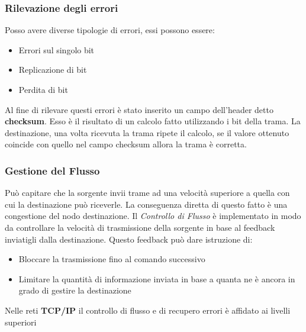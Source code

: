 \documentclass{article}
\begin{document}
        \subsubsection{Rilevazione degli errori}
            Posso avere diverse tipologie di errori, essi possono essere:
            \begin{itemize}
                \item Errori sul singolo bit
                \item Replicazione di bit
                \item Perdita di bit
            \end{itemize}
            Al fine di rilevare questi errori è stato inserito un campo dell'header detto \textbf{checksum}. Esso è il risultato di un calcolo fatto utilizzando i bit della trama. La destinazione, una volta ricevuta la trama ripete il calcolo, se il valore ottenuto coincide con quello nel campo checksum allora la trama è corretta. 

        \subsubsection{Gestione del Flusso}
            Può capitare che la sorgente invii trame ad una velocità superiore a quella con cui la destinazione può riceverle. La conseguenza diretta di questo fatto è una congestione del nodo destinazione. Il \textit{Controllo di Flusso} è implementato in modo da controllare la velocità di trasmissione della sorgente in base al feedback inviatigli dalla destinazione. Questo feedback può dare istruzione di:
            \begin{itemize}
                \item Bloccare la trasmissione fino al comando successivo
                \item Limitare la quantità di informazione inviata in base a quanta ne è ancora in grado di gestire la destinazione
            \end{itemize}
            Nelle reti \textbf{TCP/IP} il controllo di flusso e di recupero errori è affidato ai livelli superiori
         
\end{document}
